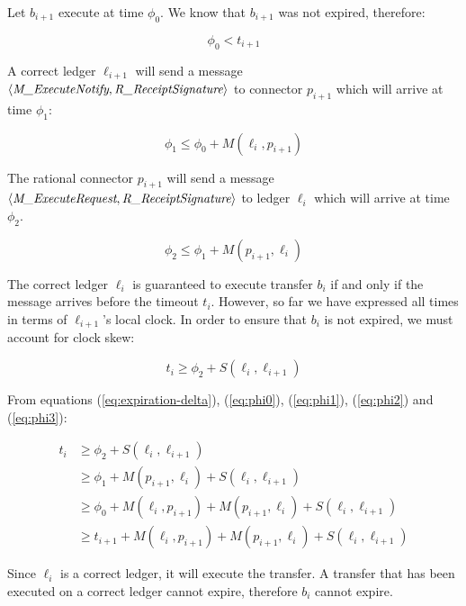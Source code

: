 \documentclass[letterpaper,twocolumn,10pt]{article}
\begin{document}
Let $b_{i+1}$ execute at time $\phi_0$. We know that $b_{i+1}$ was not expired, therefore:

\begin{equation}
\label{eq:phi0}
\phi_0 < t_{i+1}
\end{equation}

A correct ledger $\ell_{i+1}$ will send a message $\langle \textit{M\_ExecuteNotify}, \textit{R\_ReceiptSignature} \rangle$ to connector $p_{i+1}$ which will arrive at time $\phi_1$:

\begin{equation}
\label{eq:phi1}
\phi_1 \leq \phi_0 + M(\ell_i, p_{i+1})
\end{equation}

The rational connector $p_{i+1}$ will send a message $\langle \textit{M\_ExecuteRequest}, \textit{R\_ReceiptSignature} \rangle$ to ledger $\ell_i$ which will arrive at time $\phi_2$.

\begin{equation}
\label{eq:phi2}
\phi_2 \leq \phi_1 + M(p_{i+1}, \ell_i)
\end{equation}

The correct ledger $\ell_i$ is guaranteed to execute transfer $b_i$ if and only if the message arrives before the timeout $t_i$. However, so far we have expressed all times in terms of $\ell_{i+1}$'s local clock. In order to ensure that $b_i$ is not expired, we must account for clock skew:

\begin{equation}
\label{eq:phi3}
t_i \geq \phi_2 + S(\ell_i, \ell_{i+1})
\end{equation}

From equations (\ref{eq:expiration-delta}), (\ref{eq:phi0}), (\ref{eq:phi1}), (\ref{eq:phi2}) and (\ref{eq:phi3}):

\begin{equation}
\begin{split}
t_i & \geq \phi_2 + S(\ell_i, \ell_{i+1}) \\
    & \geq \phi_1 + M(p_{i+1}, \ell_i) + S(\ell_i, \ell_{i+1}) \\
    & \geq \phi_0 + M(\ell_i, p_{i+1}) + M(p_{i+1}, \ell_i) + S(\ell_i, \ell_{i+1}) \\
    & \geq t_{i+1} + M(\ell_i, p_{i+1}) + M(p_{i+1}, \ell_i) + S(\ell_i, \ell_{i+1})
\end{split}
\end{equation}

Since $\ell_i$ is a correct ledger, it will execute the transfer. A transfer that has been executed on a correct ledger cannot expire, therefore $b_i$ cannot expire.
\end{document}
